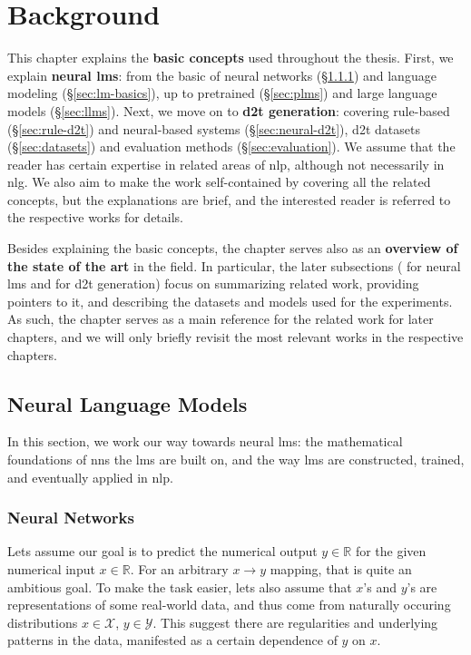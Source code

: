 
\chapter{Background}
\label{chap:background}

This chapter explains the \textbf{basic concepts} used throughout the thesis. First, we explain \textbf{neural \acp{lm}}: from the basic of neural networks (§\ref{sec:nns}) and language modeling (§\ref{sec:lm-basics}), up to pretrained (§\ref{sec:plms}) and large language models (§\ref{sec:llms}). Next, we move on to \textbf{\ac{d2t} generation}: covering rule-based (§\ref{sec:rule-d2t}) and neural-based systems (§\ref{sec:neural-d2t}), \ac{d2t} datasets (§\ref{sec:datasets}) and evaluation methods (§\ref{sec:evaluation}). We assume that the reader has certain expertise in related areas of \ac{nlp}, although not necessarily in \ac{nlg}. We also aim to make the work self-contained by covering all the related concepts, but the explanations are brief, and the interested reader is referred to the respective works for details.

Besides explaining the basic concepts, the chapter serves also as an \textbf{overview of the state of the art} in the field. In particular, the later subsections ( for neural \acp{lm} and  for \ac{d2t} generation) focus on summarizing related work, providing pointers to it, and describing the datasets and models used for the experiments. As such, the chapter serves as a main reference for the related work for later chapters, and we will only briefly revisit the most relevant works in the respective chapters.


\section{Neural Language Models}
\label{sec:lms}
In this section, we work our way towards neural \acp{lm}: the mathematical foundations of \acp{nn} the \acp{lm} are built on, and the way \acp{lm} are constructed, trained, and eventually applied in \ac{nlp}.

\subsection{Neural Networks}
\label{sec:nns}
Lets assume our goal is to predict the numerical output $y \in \mathbb{R}$ for the given numerical input $x \in \mathbb{R}$. For an arbitrary $x \rightarrow y$ mapping, that is quite an ambitious goal. To make the task easier, lets also assume that $x$'s and $y$'s are representations of some real-world data, and thus come from naturally occuring distributions $x \in \mathcal{X}$, $y \in \mathcal{Y}$. This suggest there are regularities and underlying patterns in the data, manifested as a certain dependence of $y$ on $x$.

